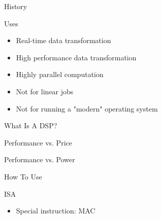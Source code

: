 \documentclass{beamer}
\begin{document}
\begin{frame}{History}
\end{frame}

\begin{frame}{Uses}
    \begin{itemize}
        \item Real-time data transformation %
        \item High performance data transformation %
        \item Highly parallel computation %
        \item Not for linear jobs %
        \item Not for running a "modern" operating system %
    \end{itemize}
\end{frame}

\begin{frame}{What Is A DSP?}
\end{frame}

\begin{frame}{Performance vs. Price}
\end{frame}

\begin{frame}{Performance vs. Power}
\end{frame}

\begin{frame}{How To Use}
\end{frame}

\begin{frame}{ISA}
    \begin{itemize}
        \item Special instruction: MAC
    \end{itemize}
\end{frame}
\end{document}
